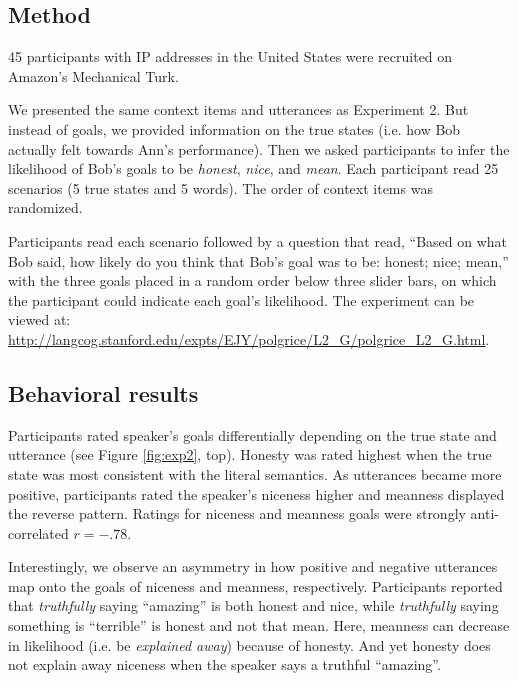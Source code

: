 \documentclass[10pt,letterpaper]{article}
\begin{document}
\subsection{Method}

45 participants with IP addresses in the United States were recruited on Amazon's Mechanical Turk.


We presented the same context items and utterances as Experiment 2.
But instead of goals, we provided information on the true states (i.e. how Bob actually felt towards Ann's performance).
Then we asked participants to infer the likelihood of Bob's goals to be \emph{honest}, \emph{nice}, and \emph{mean}.
Each participant read 25 scenarios (5 true states and 5 words).
The order of context items was randomized.

Participants read each scenario followed by a question that read, ``Based on what Bob said, how likely do you think that Bob's goal was to be: honest; nice; mean,'' with the three goals placed in a random order below three slider bars, on which the participant could indicate each goal's likelihood. 
The experiment can be viewed at: \url{http://langcog.stanford.edu/expts/EJY/polgrice/L2_G/polgrice_L2_G.html}.



\subsection{Behavioral results}

Participants rated speaker's goals differentially depending on the true state and utterance (see Figure \ref{fig:exp2}, top).
Honesty was rated highest when the true state was most consistent with the literal semantics. 
As utterances became more positive, participants rated the speaker's niceness higher and meanness displayed the reverse pattern. 
Ratings for niceness and meanness goals were strongly anti-correlated $r = -.78$.

Interestingly, we observe an asymmetry in how positive and negative utterances map onto the goals of niceness and meanness, respectively. 
Participants reported that \emph{truthfully} saying ``amazing'' is both honest and nice, while \emph{truthfully} saying something is ``terrible'' is honest and not that mean.
Here, meanness can decrease in likelihood (i.e. be \emph{explained away}) because of honesty.
And yet honesty does not explain away niceness when the speaker says a truthful ``amazing''. 
\end{document}
